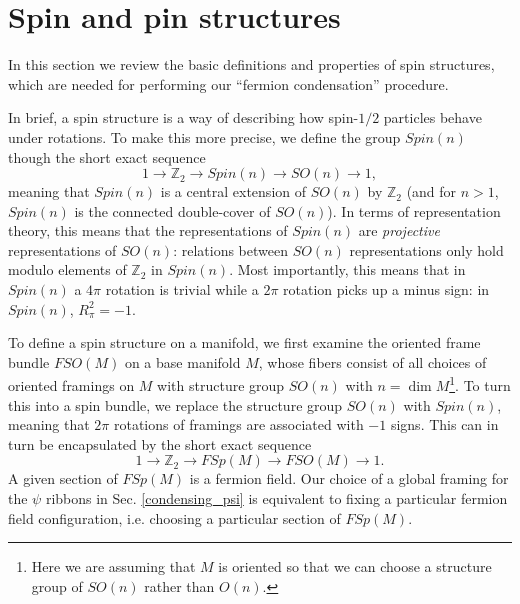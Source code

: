 \documentclass[12pt,a4paper]{article}
\newcounter{arrow}
\newcommand{\ra}{\rightarrow}
\newcommand{\zt}{\mathbb{Z}_2}
\newcommand\be            {\begin{equation}}
\newcommand\ee            {\end{equation}}
\begin{document}




\section{Spin and pin structures} \label{spin_and_pin}

In this section we review the basic definitions and properties of spin structures, which are needed for performing our ``fermion condensation'' procedure.   



In brief, a spin structure is a way of describing how spin-$1/2$ particles behave under rotations. 
To make this more precise, we define the group $Spin(n)$ though the short exact sequence
\be \label{spin_gp_seq} 1 \ra \zt \ra Spin(n) \ra SO(n) \ra 1,\ee
meaning that $Spin(n)$ is a central extension of $SO(n)$ by $\zt$ (and for $n>1$, $Spin(n)$ is the connected double-cover of $SO(n)$).  
In terms of representation theory, this means that the representations of $Spin(n)$ are {\it projective} representations of $SO(n)$: relations between $SO(n)$ representations only hold modulo elements of $\zt$ in $Spin(n)$. Most importantly, this means that in $Spin(n)$ a $4\pi$ rotation is trivial while a $2\pi$ rotation picks up a minus sign: in $Spin(n)$, $R_\pi^2 = -1$.  

To define a spin structure on a manifold, we first examine the oriented frame bundle $FSO(M)$ on a base manifold $M$, whose fibers consist of all choices of oriented framings on $M$ with structure group $SO(n)$ with $n=\dim M$\footnote{Here we are assuming that $M$ is oriented so that we can choose a structure group of $SO(n)$ rather than $O(n)$.}. To turn this into a spin bundle, we replace the structure group $SO(n)$ with $Spin(n)$, meaning that $2\pi$ rotations of framings are associated with $-1$ signs. %
This can in turn be encapsulated by the short exact sequence 
\be \label{spinbundleseq} 1 \ra \zt \ra FSp(M) \ra FSO(M) \ra 1.\ee
A given section of $FSp(M)$ is a fermion field. Our choice of a global framing for the $\psi$ ribbons in Sec. \ref{condensing_psi} is equivalent to fixing a particular fermion field configuration, i.e. choosing a particular section of $FSp(M)$. 
\end{document}
